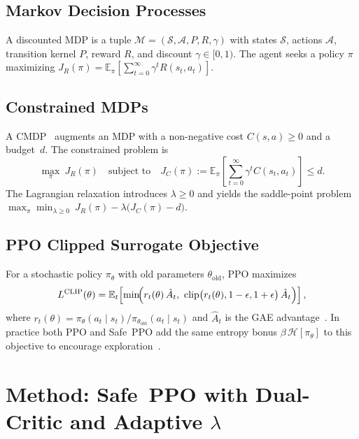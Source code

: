 \documentclass{article}
\begin{document}
\subsection{Markov Decision Processes}
A discounted MDP is a tuple $\mathcal{M} = (\mathcal{S}, \mathcal{A}, P, R, \gamma)$ with
states $\mathcal{S}$, actions $\mathcal{A}$, transition kernel $P$, reward $R$, and discount
$\gamma \in [0,1)$. The agent seeks a policy $\pi$ maximizing
$J_R(\pi) = \mathbb{E}_{\pi}\!\left[\sum_{t=0}^{\infty} \gamma^t R(s_t, a_t)\right]$.

\subsection{Constrained MDPs}
A CMDP~\citep{altman1999cmdp} augments an MDP with a non-negative cost $C(s,a) \ge 0$ and a
budget~$d$. The constrained problem is
\begin{equation}
\label{eq:cmdp}
\max_{\pi}\ J_R(\pi) \quad \text{subject to} \quad
J_C(\pi) := \mathbb{E}_{\pi}\!\left[\sum_{t=0}^{\infty} \gamma^t C(s_t, a_t)\right] \le d.
\end{equation}
The Lagrangian relaxation introduces $\lambda \ge 0$ and yields the saddle-point problem
$\max_\pi \min_{\lambda \ge 0}\ J_R(\pi) - \lambda \bigl(J_C(\pi) - d\bigr)$.

\subsection{PPO Clipped Surrogate Objective}
For a stochastic policy $\pi_\theta$ with old parameters $\theta_{\text{old}}$, PPO maximizes
\begin{equation}
\label{eq:ppo}
L^{\text{CLIP}}(\theta) = \mathbb{E}_t\!\left[
\min\!\Bigl( r_t(\theta)\,\hat{A}_t,\ \mathrm{clip}\bigl(r_t(\theta), 1-\epsilon, 1+\epsilon\bigr)\,\hat{A}_t \Bigr)
\right],
\end{equation}
where $r_t(\theta) = \pi_\theta(a_t\!\mid\!s_t) / \pi_{\theta_{\text{old}}}(a_t\!\mid\!s_t)$ and
$\hat{A}_t$ is the GAE advantage~\citep{schulman2016gae}. In practice both PPO and Safe~PPO add
the same entropy bonus $\beta\,\mathcal{H}[\pi_\theta]$ to this objective to encourage
exploration~\citep{mnih2016a3c}.


\section{Method: Safe~PPO with Dual-Critic and Adaptive $\lambda$}
\label{sec:method}
\end{document}
